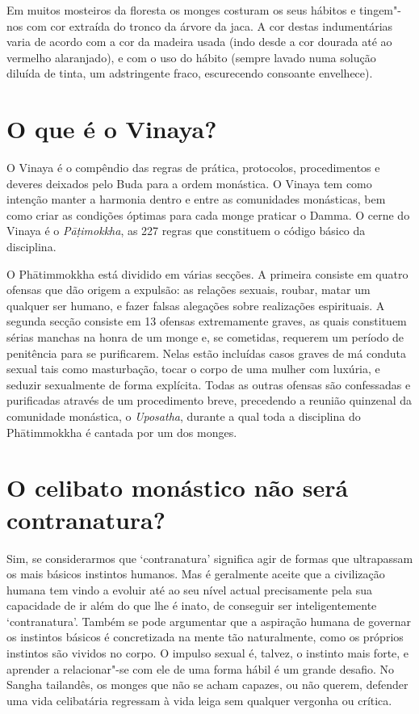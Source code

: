Em muitos mosteiros da floresta os monges costuram os seus hábitos e
tingem"-nos com cor extraída do tronco da árvore da jaca. A cor destas
indumentárias varia de acordo com a cor da madeira usada (indo desde a
cor dourada até ao vermelho alaranjado), e com o uso do hábito (sempre
lavado numa solução diluída de tinta, um adstringente fraco, escurecendo consoante envelhece).

\section{O que é o Vinaya?}

O Vinaya é o compêndio das regras de prática, protocolos, procedimentos
e deveres deixados pelo Buda para a ordem monástica. O Vinaya tem como
intenção manter a harmonia dentro e entre as comunidades monásticas, bem
como criar as condições óptimas para cada monge praticar o Damma. O
cerne do Vinaya é o \emph{Pāṭimokkha}, as 227 regras que
constituem o código básico da disciplina.

O Phātimmokkha está dividido em várias secções. A primeira consiste em
quatro ofensas que dão origem a expulsão: as relações sexuais, roubar,
matar um qualquer ser humano, e fazer falsas alegações sobre realizações
espirituais. A segunda secção consiste em 13 ofensas extremamente
graves, as quais constituem sérias manchas na honra de um monge e, se
cometidas, requerem um período de penitência para se purificarem. Nelas
estão incluídas casos graves de má conduta sexual tais como masturbação,
tocar o corpo de uma mulher com luxúria, e seduzir sexualmente de forma
explícita. Todas as outras ofensas são confessadas e purificadas através
de um procedimento breve, precedendo a reunião quinzenal da comunidade
monástica, o \emph{Uposatha}, durante a qual toda a disciplina do
Phātimmokkha é cantada por um dos monges.

\section{O celibato monástico não será contranatura?}

Sim, se considerarmos que `contranatura' significa agir de formas que
ultrapassam os mais básicos instintos humanos. Mas é geralmente aceite
que a civilização humana tem vindo a evoluir até ao seu nível actual
precisamente pela sua capacidade de ir além do que lhe é inato, de
conseguir ser inteligentemente `contranatura'. Também se pode
argumentar que a aspiração humana de governar os instintos básicos é
concretizada na mente tão naturalmente, como os próprios instintos são
vividos no corpo. O impulso sexual é, talvez, o instinto mais forte, e
aprender a relacionar"-se com ele de uma forma hábil é um grande desafio.
No Sangha tailandês, os monges que não se acham capazes, ou não querem,
defender uma vida celibatária regressam à vida leiga sem qualquer
vergonha ou crítica.

